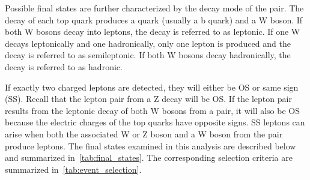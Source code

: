 Possible final states are further characterized by the decay mode of the \ttbar
pair. The decay of each top quark produces a quark (usually a b quark) and a W
boson. If both W bosons decay into leptons, the decay is referred to as
leptonic. If one W decays leptonically and one hadronically, only one lepton is
produced and the decay is referred to as semileptonic. If both W bosons decay
hadronically, the decay is referred to as hadronic.

If exactly two charged leptons are detected, they will either be OS or same
sign (SS). Recall that the lepton pair from a Z decay will be OS. If the lepton
pair results from the leptonic decay of both W bosons from a \ttbar pair, it
will also be OS because the electric charges of the top quarks have opposite signs.
SS leptons can arise when both the associated W or Z boson and a W boson from
the \ttbar pair produce leptons. The final states examined in this analysis are
described below and summarized in~\cref{tab:final_states}. The corresponding
selection criteria are summarized in~\cref{tab:event_selection}.

